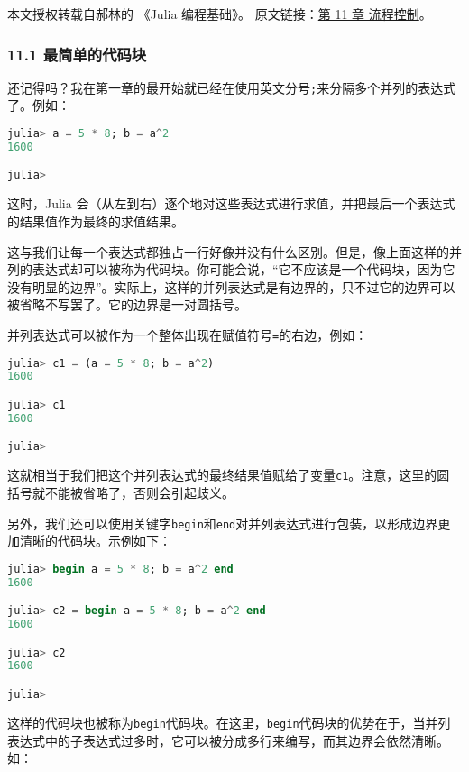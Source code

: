 
本文授权转载自郝林的 《Julia 编程基础》。 原文链接：\href{https://github.com/hyper0x/JuliaBasics/blob/master/book/ch11.md}{第 11 章 流程控制}。

\subsubsection{11.1 最简单的代码块}

还记得吗？我在第一章的最开始就已经在使用英文分号\verb`;`来分隔多个并列的表达式了。例如：

\begin{lstlisting}[language=julia]
julia> a = 5 * 8; b = a^2
1600

julia> 
\end{lstlisting}

这时，Julia 会（从左到右）逐个地对这些表达式进行求值，并把最后一个表达式的结果值作为最终的求值结果。

这与我们让每一个表达式都独占一行好像并没有什么区别。但是，像上面这样的并列的表达式却可以被称为代码块。你可能会说，“它不应该是一个代码块，因为它没有明显的边界”。实际上，这样的并列表达式是有边界的，只不过它的边界可以被省略不写罢了。它的边界是一对圆括号。

并列表达式可以被作为一个整体出现在赋值符号\verb`=`的右边，例如：

\begin{lstlisting}[language=julia]
julia> c1 = (a = 5 * 8; b = a^2)
1600

julia> c1
1600

julia> 
\end{lstlisting}

这就相当于我们把这个并列表达式的最终结果值赋给了变量\verb`c1`。注意，这里的圆括号就不能被省略了，否则会引起歧义。

另外，我们还可以使用关键字\verb`begin`和\verb`end`对并列表达式进行包装，以形成边界更加清晰的代码块。示例如下：

\begin{lstlisting}[language=julia]
julia> begin a = 5 * 8; b = a^2 end
1600

julia> c2 = begin a = 5 * 8; b = a^2 end
1600

julia> c2
1600

julia> 
\end{lstlisting}

这样的代码块也被称为\verb`begin`代码块。在这里，\verb`begin`代码块的优势在于，当并列表达式中的子表达式过多时，它可以被分成多行来编写，而其边界会依然清晰。如：

